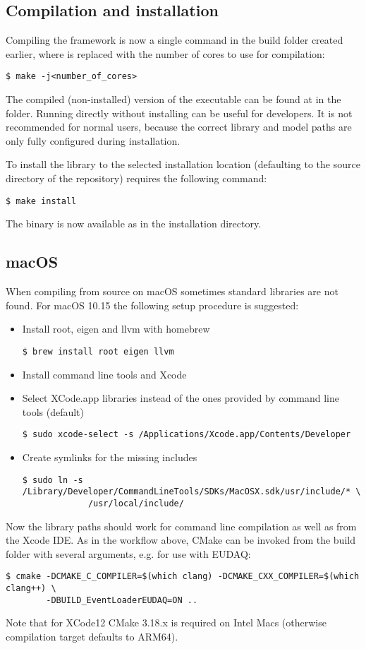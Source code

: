 \subsection{Compilation and installation}
Compiling the framework is now a single command in the build folder created earlier, where  is replaced with the number of cores to use for compilation:
\begin{verbatim}
$ make -j<number_of_cores>
\end{verbatim}
The compiled (non-installed) version of the executable can be found at  in the  folder.
Running \corry directly without installing can be useful for developers.
It is not recommended for normal users, because the correct library and model paths are only fully configured during installation.

To install the library to the selected installation location (defaulting to the source directory of the repository) requires the following command:
\begin{verbatim}
$ make install
\end{verbatim}

The binary is now available as  in the installation directory.

\subsection{macOS}
When compiling from source on macOS sometimes standard libraries are not found. For macOS 10.15 the following setup procedure is suggested:
\begin{itemize}
\item Install root, eigen and llvm with homebrew
\begin{verbatim}
$ brew install root eigen llvm
\end{verbatim}
\item Install command line tools and Xcode
\item Select XCode.app libraries instead of the ones provided by command line tools (default)
\begin{verbatim}
$ sudo xcode-select -s /Applications/Xcode.app/Contents/Developer
\end{verbatim}
\item Create symlinks for the missing includes
\begin{verbatim}
$ sudo ln -s /Library/Developer/CommandLineTools/SDKs/MacOSX.sdk/usr/include/* \
             /usr/local/include/
\end{verbatim}
\end{itemize}
Now the library paths should work for command line compilation as well as from the Xcode IDE. As in the workflow above, CMake can be invoked from the build folder with several arguments, e.g. for use with EUDAQ:
\begin{verbatim}
$ cmake -DCMAKE_C_COMPILER=$(which clang) -DCMAKE_CXX_COMPILER=$(which clang++) \
        -DBUILD_EventLoaderEUDAQ=ON ..
\end{verbatim}
Note that for XCode12 CMake 3.18.x is required on Intel Macs (otherwise compilation target defaults to ARM64).

